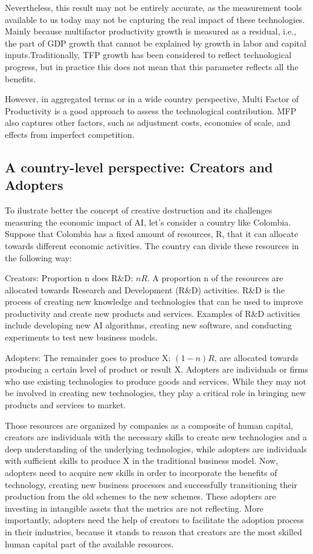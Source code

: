 \documentclass[preprint, 1p,
authoryear]{elsarticle} %
\begin{document}
Nevertheless, this result may not be entirely accurate, as the
measurement tools available to us today may not be capturing the real
impact of these technologies. Mainly because multifactor productivity
growth is measured as a residual, i.e., the part of GDP growth that
cannot be explained by growth in labor and capital inputs.Traditionally,
TFP growth has been considered to reflect technological progress, but in
practice this does not mean that this parameter reflects all the
benefits.

However, in aggregated terms or in a wide country perspective, Multi
Factor of Productivity is a good approach to assess the technological
contribution. MFP also captures other factors, such as adjustment costs,
economies of scale, and effects from imperfect competition.

\hypertarget{a-country-level-perspective-creators-and-adopters}{%
\subsection{A country-level perspective: Creators and
Adopters}\label{a-country-level-perspective-creators-and-adopters}}

To ilustrate better the concept of creative destruction and its
challenges measuring the economic impact of AI, let's consider a country
like Colombia. Suppose that Colombia has a fixed amount of resources, R,
that it can allocate towards different economic activities. The country
can divide these resources in the following way:

Creators: Proportion n does R\&D: \(nR\). A proportion n of the
resources are allocated towards Research and Development (R\&D)
activities. R\&D is the process of creating new knowledge and
technologies that can be used to improve productivity and create new
products and services. Examples of R\&D activities include developing
new AI algorithms, creating new software, and conducting experiments to
test new business models.

Adopters: The remainder goes to produce X: \((1-n)R\), are allocated
towards producing a certain level of product or result X. Adopters are
individuals or firms who use existing technologies to produce goods and
services. While they may not be involved in creating new technologies,
they play a critical role in bringing new products and services to
market.

Those resources are organized by companies as a composite of human
capital, creators are individuals with the necessary skills to create
new technologies and a deep understanding of the underlying
technologies, while adopters are individuals with sufficient skills to
produce X in the traditional business model. Now, adopters need to
acquire new skills in order to incorporate the benefits of technology,
creating new business processes and successfully transitioning their
production from the old schemes to the new schemes. These adopters are
investing in intangible assets that the metrics are not reflecting. More
importantly, adopters need the help of creators to facilitate the
adoption process in their industries, because it stands to reason that
creators are the most skilled human capital part of the available
resources.
\end{document}
